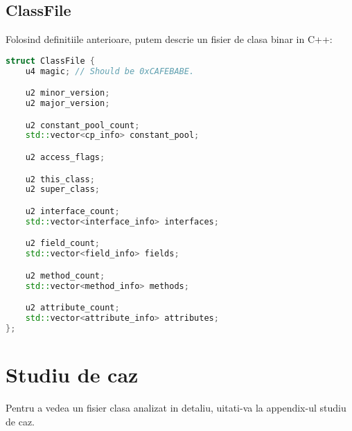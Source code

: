 \subsection{ClassFile}\label{classfile}

Folosind definitiile anterioare, putem descrie un fisier de clasa binar
in C++:


\begin{lstlisting}[language=C++]
struct ClassFile {
    u4 magic; // Should be 0xCAFEBABE.

    u2 minor_version;
    u2 major_version;

    u2 constant_pool_count;
    std::vector<cp_info> constant_pool;

    u2 access_flags;

    u2 this_class;
    u2 super_class;

    u2 interface_count;
    std::vector<interface_info> interfaces;

    u2 field_count;
    std::vector<field_info> fields;

    u2 method_count;
    std::vector<method_info> methods;

    u2 attribute_count;
    std::vector<attribute_info> attributes;
};
\end{lstlisting}

\section{Studiu de caz}

Pentru a vedea un fisier clasa analizat in detaliu, uitati-va la appendix-ul studiu de caz.
